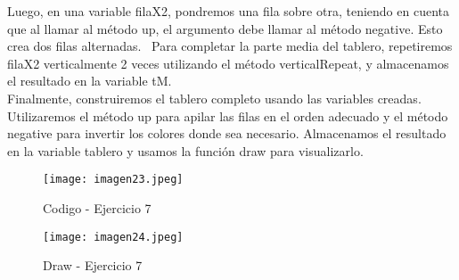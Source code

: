 \documentclass[10pt, a4paper]{article}
\begin{document}
\begin{flushleft}
			Luego, en una variable filaX2, pondremos una fila sobre otra, teniendo en cuenta que al llamar al método up, el argumento debe llamar al método negative. Esto crea dos filas alternadas.	\		
			Para completar la parte media del tablero, repetiremos filaX2 verticalmente 2 veces utilizando el método verticalRepeat, y almacenamos el resultado en la variable tM.	\\		
			Finalmente, construiremos el tablero completo usando las variables creadas. Utilizaremos el método up para apilar las filas en el orden adecuado y el método negative para invertir los colores donde sea necesario. Almacenamos el resultado en la variable tablero y usamos la función draw para visualizarlo.\\
		\end{flushleft}
		\begin{figure}[h]
			\centering
			\texttt{[image: imagen23.jpeg]}
			\caption{Codigo - Ejercicio 7}
		\end{figure}
		\begin{figure}[h]
			\centering
			\texttt{[image: imagen24.jpeg]}
			\caption{Draw - Ejercicio 7}
		\end{figure} 
\end{document}

